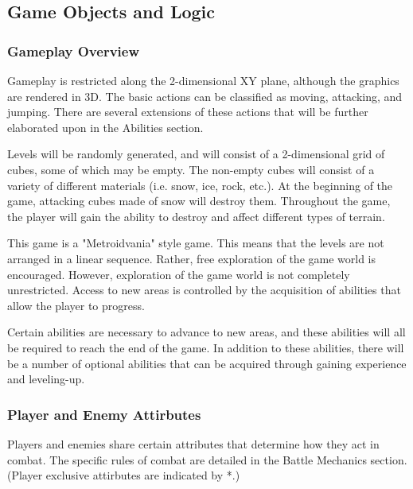 \documentclass{article}
\begin{document}
\subsection{Game Objects and Logic}

\subsubsection{Gameplay Overview}

Gameplay is restricted along the 2-dimensional XY plane, although the graphics are rendered in 3D.  The basic actions can be classified as moving, attacking, and jumping.  There are several extensions of these actions that will be further elaborated upon in the Abilities section.

Levels will be randomly generated, and will consist of a 2-dimensional grid of cubes, some of which may be empty.  The non-empty cubes will consist of a variety of different materials (i.e. snow, ice, rock, etc.).  At the beginning of the game, attacking cubes made of snow will destroy them.  Throughout the game, the player will gain the ability to destroy and affect different types of terrain.

This game is a "Metroidvania" style game.  This means that the levels are not arranged in a linear sequence.  Rather, free exploration of the game world is encouraged.  However, exploration of the game world is not completely unrestricted.  Access to new areas is controlled by the acquisition of abilities that allow the player to progress.

Certain abilities are necessary to advance to new areas, and these abilities will all be required to reach the end of the game.  In addition to these abilities, there will  be a number of optional abilities that can be acquired through gaining experience and leveling-up.

\subsubsection{Player and Enemy Attirbutes}

Players and enemies share certain attributes that determine how they act in combat.  The specific rules of combat are detailed in the Battle Mechanics section.  (Player exclusive attirbutes are indicated by *.)
\end{document}
